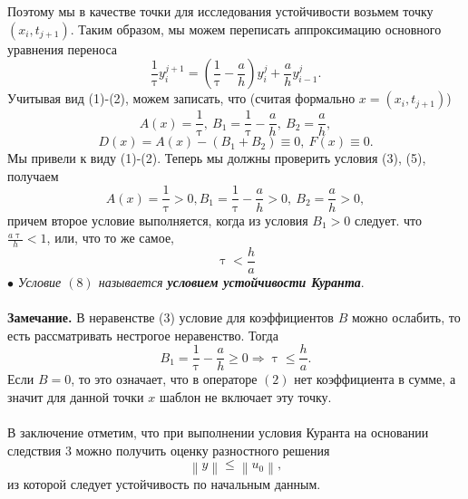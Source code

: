 \documentclass[a4paper, 12pt]{report}
\numberwithin{equation}{section}
\renewcommand{\leq}{\leqslant}
\renewcommand{\geq}{\geqslant}
\renewcommand{\tau}{\uptau}
\newcommand\Norm[1]{\left\| #1 \right\|}
\begin{document}
		 Поэтому мы в качестве точки для исследования устойчивости возьмем точку $(x_i, t_{j+1})$. Таким образом, мы можем переписать аппроксимацию основного уравнения переноса
		 $$\dfrac{1}{\tau} y_i^{j+1} = \left(\dfrac{1}{\tau} - \dfrac a h\right)y_i^j + \dfrac a hy_{i-1}^j.$$
		 Учитывая вид (1)-(2), можем записать, что (считая формально $x = (x_i, t_{j+1})$)
		 $$A(x) = \dfrac 1 \tau,\ B_1 = \dfrac 1 \tau - \dfrac a h,\ B_2 = \dfrac a h,$$
		 $$D(x) = A(x) - (B_1 + B_2) \equiv 0,\ F(x)\equiv 0.$$
		 Мы привели к виду (1)-(2). Теперь мы должны проверить условия (3), (5), получаем
		 $$A(x) = \dfrac 1 \tau > 0, B_1 = \dfrac 1 \tau - \dfrac a h > 0,\ B_2 = \dfrac a h > 0,$$
		 причем второе условие выполняется, когда из условия $B_1 > 0$ следует. что $\frac {a\tau } h < 1$, или, что то же самое, \begin{equation}
		 	\tau < \dfrac h a
		 \end{equation}
		 $\bullet$ \textit{Условие $(8)$ называется \textbf{условием устойчивости Куранта}}.\\\\
		 \textbf{Замечание.} В неравенстве (3) условие для коэффициентов $B$ можно ослабить, то есть рассматривать нестрогое неравенство. Тогда
		 $$B_1 = \dfrac 1 \tau - \dfrac a h \geq 0 \Rightarrow \tau \leq \dfrac h a.$$
		 Если $B=0$, то это означает, что в операторе $(2)$ нет коэффициента в сумме, а значит для данной точки $x$ шаблон не включает эту точку.\\\\
		 В заключение отметим, что при выполнении условия Куранта на основании следствия 3 можно получить оценку разностного решения
		 $$\Norm{y}\leq \Norm{u_0},$$
		 из которой следует устойчивость по начальным данным.
\end{document}
